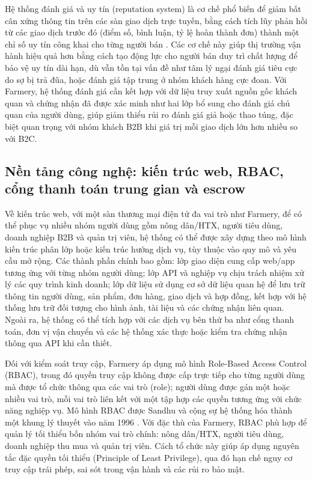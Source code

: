 Hệ thống đánh giá và uy tín (reputation system) là cơ chế phổ biến để giảm bất cân xứng thông tin trên các sàn giao dịch trực tuyến, bằng cách tích lũy phản hồi từ các giao dịch trước đó (điểm số, bình luận, tỷ lệ hoàn thành đơn) thành một chỉ số uy tín công khai cho từng người bán \cite{springer_article}. Các cơ chế này giúp thị trường vận hành hiệu quả hơn bằng cách tạo động lực cho người bán duy trì chất lượng để bảo vệ uy tín dài hạn, dù vẫn tồn tại vấn đề như tâm lý ngại đánh giá tiêu cực do sợ bị trả đũa, hoặc đánh giá tập trung ở nhóm khách hàng cực đoan. Với Farmery, hệ thống đánh giá cần kết hợp với dữ liệu truy xuất nguồn gốc khách quan và chứng nhận đã được xác minh như hai lớp bổ sung cho đánh giá chủ quan của người dùng, giúp giảm thiểu rủi ro đánh giá giả hoặc thao túng, đặc biệt quan trọng với nhóm khách B2B khi giá trị mỗi giao dịch lớn hơn nhiều so với B2C.

\subsection{Nền tảng công nghệ: kiến trúc web, RBAC, cổng thanh toán trung gian và escrow}

Về kiến trúc web, với một sàn thương mại điện tử đa vai trò như Farmery, để có thể phục vụ nhiều nhóm người dùng gồm nông dân/HTX, người tiêu dùng, doanh nghiệp B2B và quản trị viên, hệ thống có thể được xây dựng theo mô hình kiến trúc phân lớp hoặc kiến trúc hướng dịch vụ, tùy thuộc vào quy mô và yêu cầu mở rộng. Các thành phần chính bao gồm: lớp giao diện cung cấp web/app tương ứng với từng nhóm người dùng; lớp API và nghiệp vụ chịu trách nhiệm xử lý các quy trình kinh doanh; lớp dữ liệu sử dụng cơ sở dữ liệu quan hệ để lưu trữ thông tin người dùng, sản phẩm, đơn hàng, giao dịch và hợp đồng, kết hợp với hệ thống lưu trữ đối tượng cho hình ảnh, tài liệu và các chứng nhận liên quan. Ngoài ra, hệ thống có thể tích hợp với các dịch vụ bên thứ ba như cổng thanh toán, đơn vị vận chuyển và các hệ thống xác thực hoặc kiểm tra chứng nhận thông qua API khi cần thiết.

Đối với kiểm soát truy cập, Farmery áp dụng mô hình Role-Based Access Control (RBAC), trong đó quyền truy cập không được cấp trực tiếp cho từng người dùng mà được tổ chức thông qua các vai trò (role); người dùng được gán một hoặc nhiều vai trò, mỗi vai trò liên kết với một tập hợp các quyền tương ứng với chức năng nghiệp vụ. Mô hình RBAC được Sandhu và cộng sự hệ thống hóa thành một khung lý thuyết vào năm 1996 \cite{sandhu1996rbac}. Với đặc thù của Farmery, RBAC phù hợp để quản lý tối thiểu bốn nhóm vai trò chính: nông dân/HTX, người tiêu dùng, doanh nghiệp thu mua và quản trị viên. Cách tổ chức này giúp áp dụng nguyên tắc đặc quyền tối thiểu (Principle of Least Privilege), qua đó hạn chế nguy cơ truy cập trái phép, sai sót trong vận hành và các rủi ro bảo mật.

